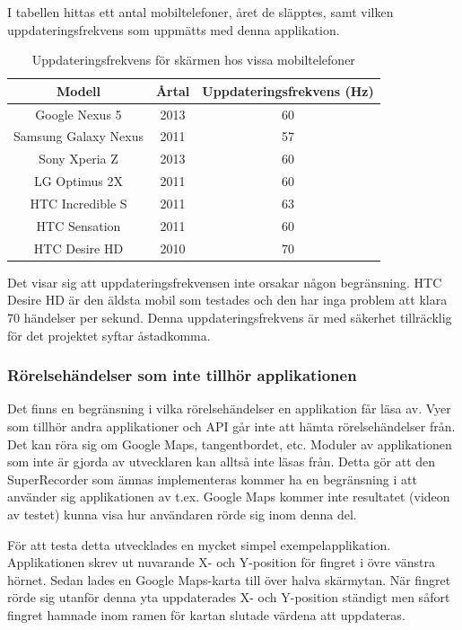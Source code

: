 I tabellen hittas ett antal mobiltelefoner, året de släpptes, samt vilken uppdateringsfrekvens som uppmätts med denna applikation.
\begin{table}[h!]
	\begin{center}
	\begin{tabular}{| c | c | c |}
		\hline
		Modell & Årtal & Uppdateringsfrekvens (Hz) \\
		\hline
		Google Nexus 5 & 2013 & 60 \\
    Samsung Galaxy Nexus & 2011 & 57 \\
		Sony Xperia Z & 2013 & 60 \\
		LG Optimus 2X & 2011 & 60 \\
		HTC Incredible S & 2011 & 63 \\
		HTC Sensation & 2011 & 60 \\
		HTC Desire HD & 2010 & 70 \\
		\hline
	\end{tabular}
	\end{center}
	\caption{Uppdateringsfrekvens för skärmen hos vissa mobiltelefoner}
	\label{tab:freq}
\end{table}

Det visar sig att uppdateringsfrekvensen inte orsakar någon begränsning. HTC Desire HD är den äldsta mobil som testades och den har inga problem att klara 70 händelser per sekund. Denna uppdateringsfrekvens är med säkerhet tillräcklig för det projektet syftar åstadkomma.

\subsubsection{Rörelsehändelser som inte tillhör applikationen}
\label{toucheventsoutofapi}
Det finns en begränsning i vilka rörelsehändelser en applikation får läsa av. Vyer som tillhör andra applikationer och API går inte att hämta rörelsehändelser från. Det kan röra sig om Google Maps, tangentbordet, etc. Moduler av applikationen som inte är gjorda av utvecklaren kan alltså inte läsas från. Detta gör att den SuperRecorder som ämnas implementeras kommer ha en begränsning i att använder sig applikationen av t.ex. Google Maps kommer inte resultatet (videon av testet) kunna visa hur användaren rörde sig inom denna del.

För att testa detta utvecklades en mycket simpel exempelapplikation. Applikationen skrev ut nuvarande X- och Y-position för fingret i övre vänstra hörnet. Sedan lades en Google Maps-karta till över halva skärmytan. När fingret rörde sig utanför denna yta uppdaterades X- och Y-position ständigt men såfort fingret hamnade inom ramen för kartan slutade värdena att uppdateras.


